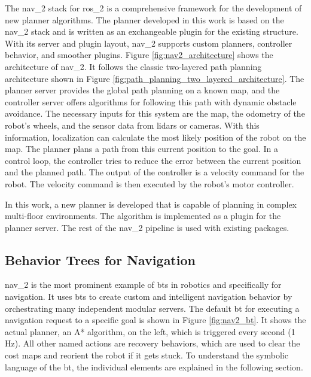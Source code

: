 The \gls{nav_2} stack for \gls{ros_2} is a comprehensive framework for the development of new planner algorithms. The planner developed in this work is based on the \gls{nav_2} stack and is written as an exchangeable plugin for the existing structure. With its server and plugin layout, \gls{nav_2} supports custom planners, controller behavior, and smoother plugins. Figure \ref{fig:nav2_architecture} shows the architecture of \gls{nav_2}. It follows the classic two-layered path planning architecture shown in Figure \ref{fig:path_planning_two_layered_architecture}. The planner server provides the global path planning on a known map, and the controller server offers algorithms for following this path with dynamic obstacle avoidance. The necessary inputs for this system are the map, the odometry of the robot's wheels, and the sensor data from lidars or cameras. With this information, localization can calculate the most likely position of the robot on the map. The planner plans a path from this current position to the goal. In a control loop, the controller tries to reduce the error between the current position and the planned path. The output of the controller is a velocity command for the robot. The velocity command is then executed by the robot's motor controller.

In this work, a new planner is developed that is capable of planning in complex multi-floor environments. The algorithm is implemented as a plugin for the planner server. The rest of the \gls{nav_2} pipeline is used with existing packages.

\subsection{Behavior Trees for Navigation}

\gls{nav_2} is the most prominent example of \glspl{bt} in robotics and specifically for navigation. It uses \glspl{bt} to create custom and intelligent navigation behavior by orchestrating many independent modular servers. The default \gls{bt} for executing a navigation request to a specific goal is shown in Figure \ref{fig:nav2_bt}. It shows the actual planner, an A* algorithm, on the left, which is triggered every second (1 Hz). All other named actions are recovery behaviors, which are used to clear the cost maps and reorient the robot if it gets stuck. To understand the symbolic language of the \gls{bt}, the individual elements are explained in the following section.

